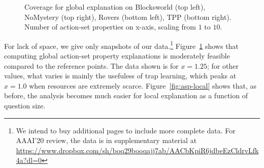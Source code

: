 %
\begin{figure}[h!]
\vspace{-0.2cm}
\small
\centering




\vspace{-0.3cm}
\caption{\label{fig:asp-global} Coverage for global explanation on 
Blocksworld (top left), NoMystery (top right), Rovers (bottom left),
TPP (bottom right). Number of action-set properties on x-axis,
scaling from $1$ to $10$.
}
\vspace{-0.2cm}
\end{figure}

For lack of space, we give only snapshots of our data.\footnote{We
intend to buy additional pages to include more complete data. For
AAAI'20 review, the data is in supplementary material at
{\scriptsize \url{https://www.dropbox.com/sh/boq29booqajj7ab/AACbKpiR6jdbeEzCldrvLfk4a?dl=0}}}
%
Figure~\ref{fig:asp-global} shows that computing global action-set
property explanations is moderately feasible compared to the reference
points. The data shown is for $x = 1.25$; for other values, what
varies is mainly the usefuless of trap learning, which peaks at $x =
1.0$ when resources are extremely scarce.
%
%
Figure~\ref{fig:asp-local} shows that, as before, the analysis becomes
much easier for local explanation as a function of question size.

